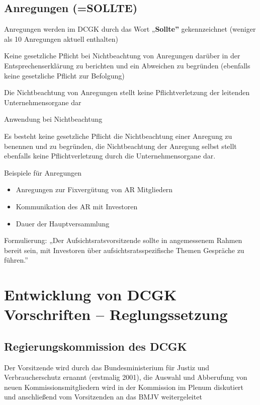 \documentclass[
]{article}
\providecommand{\tightlist}{%
  \setlength{\itemsep}{0pt}\setlength{\parskip}{0pt}}
\begin{document}
\hypertarget{anregungen-sollte}{%
\subsection{Anregungen (=SOLLTE)}\label{anregungen-sollte}}

Anregungen werden im DCGK durch das Wort „\textbf{Sollte''}
gekennzeichnet (weniger als 10 Anregungen aktuell enthalten)

Keine gesetzliche Pflicht bei Nichtbeachtung von Anregungen darüber in
der Entsprechenserklärung zu berichten und ein Abweichen zu begründen
(ebenfalls keine gesetzliche Pflicht zur Befolgung)

Die Nichtbeachtung von Anregungen stellt keine Pflichtverletzung der
leitenden Unternehmensorgane dar

Anwendung bei Nichtbeachtung

Es besteht keine gesetzliche Pflicht die Nichtbeachtung einer Anregung
zu benennen und zu begründen, die Nichtbeachtung der Anregung selbst
stellt ebenfalls keine Pflichtverletzung durch die Unternehmensorgane
dar.

Beispiele für Anregungen

\begin{itemize}
\tightlist
\item
  Anregungen zur Fixvergütung von AR Mitgliedern
\item
  Kommunikation des AR mit Investoren
\item
  Dauer der Hauptversammlung
\end{itemize}

Formulierung: „Der Aufsichtsratsvorsitzende sollte in angemessenem
Rahmen bereit sein, mit Investoren über aufsichtsratsspezifische Themen
Gespräche zu führen.''

\hypertarget{entwicklung-von-dcgk-vorschriften-reglungssetzung}{%
\section{Entwicklung von DCGK Vorschriften --
Reglungssetzung}\label{entwicklung-von-dcgk-vorschriften-reglungssetzung}}

\hypertarget{regierungskommission-des-dcgk}{%
\subsection{Regierungskommission des
DCGK}\label{regierungskommission-des-dcgk}}

Der Vorsitzende wird durch das Bundesministerium für Justiz und
Verbraucherschutz ernannt (erstmalig 2001), die Auswahl und Abberufung
von neuen Kommissionsmitgliedern wird in der Kommission im Plenum
diskutiert und anschließend vom Vorsitzenden an das BMJV weitergeleitet
\end{document}
